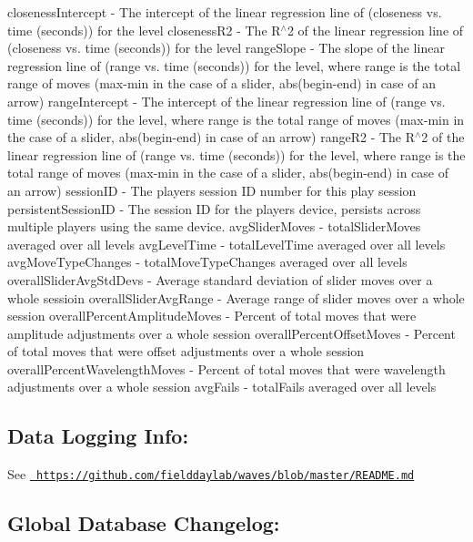 closeness\+Intercept -\/ The intercept of the linear regression line of (closeness vs. time (seconds)) for the level closeness\+R2 -\/ The R$^\wedge$2 of the linear regression line of (closeness vs. time (seconds)) for the level range\+Slope -\/ The slope of the linear regression line of (range vs. time (seconds)) for the level, where range is the total range of moves (max-\/min in the case of a slider, abs(begin-\/end) in case of an arrow) range\+Intercept -\/ The intercept of the linear regression line of (range vs. time (seconds)) for the level, where range is the total range of moves (max-\/min in the case of a slider, abs(begin-\/end) in case of an arrow) range\+R2 -\/ The R$^\wedge$2 of the linear regression line of (range vs. time (seconds)) for the level, where range is the total range of moves (max-\/min in the case of a slider, abs(begin-\/end) in case of an arrow) session\+ID -\/ The player\textquotesingle{}s session ID number for this play session persistent\+Session\+ID -\/ The session ID for the player\textquotesingle{}s device, persists across multiple players using the same device. avg\+Slider\+Moves -\/ total\+Slider\+Moves averaged over all levels avg\+Level\+Time -\/ total\+Level\+Time averaged over all levels avg\+Move\+Type\+Changes -\/ total\+Move\+Type\+Changes averaged over all levels overall\+Slider\+Avg\+Std\+Devs -\/ Average standard deviation of slider moves over a whole sessioin overall\+Slider\+Avg\+Range -\/ Average range of slider moves over a whole session overall\+Percent\+Amplitude\+Moves -\/ Percent of total moves that were amplitude adjustments over a whole session overall\+Percent\+Offset\+Moves -\/ Percent of total moves that were offset adjustments over a whole session overall\+Percent\+Wavelength\+Moves -\/ Percent of total moves that were wavelength adjustments over a whole session avg\+Fails -\/ total\+Fails averaged over all levels

\subsection*{Data Logging Info\+:}

See \href{https://github.com/fielddaylab/waves/blob/master/README.md}{\texttt{ https\+://github.\+com/fielddaylab/waves/blob/master/\+R\+E\+A\+D\+M\+E.\+md}}

\subsection*{Global Database Changelog\+:}

